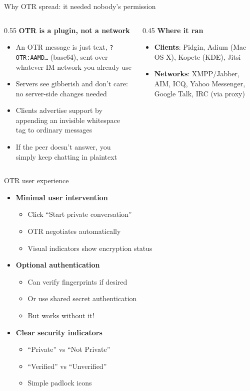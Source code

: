 \ifdefined\PRESENTATION\else\PassOptionsToClass{handout}{beamer}\fi\documentclass[aspectratio=169, lualatex]{beamer}
\begin{document}
\begin{frame}{Why OTR spread: it needed nobody's permission}
	\begin{columns}
		\begin{column}{0.55\textwidth}
			\textbf{OTR is a plugin, not a network}
			\begin{itemize}
				\item An OTR message is just text, \texttt{?OTR:AAMD\ldots} (base64), sent over whatever IM network you already use
				\item Servers see gibberish and don't care: no server-side changes needed
				\item Clients advertise support by appending an invisible whitespace tag to ordinary messages
				\item If the peer doesn't answer, you simply keep chatting in plaintext
			\end{itemize}
		\end{column}
		\begin{column}{0.45\textwidth}
			\textbf{Where it ran}
			\begin{itemize}
				\item \textbf{Clients}: Pidgin, Adium (Mac OS X), Kopete (KDE), Jitsi
				\item \textbf{Networks}: XMPP/Jabber, AIM, ICQ, Yahoo Messenger, Google Talk, IRC (via proxy)
			\end{itemize}
		\end{column}
	\end{columns}
\end{frame}

\begin{frame}{OTR user experience}
	\begin{itemize}
		\item \textbf{Minimal user intervention}
		      \begin{itemize}
			      \item Click ``Start private conversation''
			      \item OTR negotiates automatically
			      \item Visual indicators show encryption status
		      \end{itemize}
		\item \textbf{Optional authentication}
		      \begin{itemize}
			      \item Can verify fingerprints if desired
			      \item Or use shared secret authentication
			      \item But works without it!
		      \end{itemize}
		\item \textbf{Clear security indicators}
		      \begin{itemize}
			      \item ``Private'' vs ``Not Private''
			      \item ``Verified'' vs ``Unverified''
			      \item Simple padlock icons
		      \end{itemize}
	\end{itemize}
\end{frame}
\end{document}

